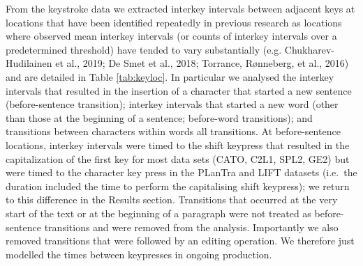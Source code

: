\documentclass[
  man,floatsintext]{apa7}
\begin{document}
From the keystroke data we extracted interkey intervals between adjacent keys at locations that have been identified repeatedly in previous research as locations where observed mean interkey intervals (or counts of interkey intervals over a predetermined threshold) have tended to vary substantially (e.g. Chukharev-Hudilainen et al., 2019; De Smet et al., 2018; Torrance, Rønneberg, et al., 2016) and are detailed in Table \ref{tab:keyloc}. In particular we analysed the interkey intervals that resulted in the insertion of a character that started a new sentence (before-sentence transition); interkey intervals that started a new word (other than those at the beginning of a sentence; before-word transitions); and transitions between characters within words all transitions. At before-sentence locations, interkey intervals were timed to the shift keypress that resulted in the capitalization of the first key for most data sets (CATO, C2L1, SPL2, GE2) but were timed to the character key press in the PLanTra and LIFT datasets (i.e.~the duration included the time to perform the capitalising shift keypress); we return to this difference in the Results section. Transitions that occurred at the very start of the text or at the beginning of a paragraph were not treated as before-sentence transitions and were removed from the analysis. Importantly we also removed transitions that were followed by an editing operation. We therefore just modelled the times between keypresses in ongoing production.
\end{document}
